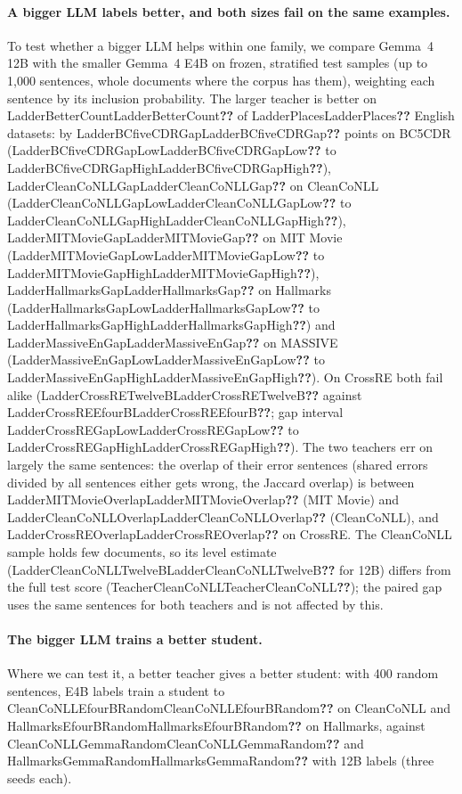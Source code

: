 \documentclass[11pt]{article}
\newcommand{\res}[1]{\ifcsname #1\endcsname\csname #1\endcsname\else\textbf{??}\fi}
\begin{document}
\paragraph{A bigger LLM labels better, and both sizes fail on the same examples.} To test whether a bigger LLM helps within one family, we compare Gemma~4 12B with the smaller Gemma~4 E4B on frozen, stratified test samples (up to 1{,}000 sentences, whole documents where the corpus has them), weighting each sentence by its inclusion probability. The larger teacher is better on \res{LadderBetterCount} of \res{LadderPlaces} English datasets: by \res{LadderBCfiveCDRGap} points on BC5CDR (\res{LadderBCfiveCDRGapLow} to \res{LadderBCfiveCDRGapHigh}), \res{LadderCleanCoNLLGap} on CleanCoNLL (\res{LadderCleanCoNLLGapLow} to \res{LadderCleanCoNLLGapHigh}), \res{LadderMITMovieGap} on MIT Movie (\res{LadderMITMovieGapLow} to \res{LadderMITMovieGapHigh}), \res{LadderHallmarksGap} on Hallmarks (\res{LadderHallmarksGapLow} to \res{LadderHallmarksGapHigh}) and \res{LadderMassiveEnGap} on MASSIVE (\res{LadderMassiveEnGapLow} to \res{LadderMassiveEnGapHigh}). On CrossRE both fail alike (\res{LadderCrossRETwelveB} against \res{LadderCrossREEfourB}; gap interval \res{LadderCrossREGapLow} to \res{LadderCrossREGapHigh}). The two teachers err on largely the same sentences: the overlap of their error sentences (shared errors divided by all sentences either gets wrong, the Jaccard overlap) is between \res{LadderMITMovieOverlap} (MIT Movie) and \res{LadderCleanCoNLLOverlap} (CleanCoNLL), and \res{LadderCrossREOverlap} on CrossRE. The CleanCoNLL sample holds few documents, so its level estimate (\res{LadderCleanCoNLLTwelveB} for 12B) differs from the full test score (\res{TeacherCleanCoNLL}); the paired gap uses the same sentences for both teachers and is not affected by this.

\paragraph{The bigger LLM trains a better student.} Where we can test it, a better teacher gives a better student: with 400 random sentences, E4B labels train a student to \res{CleanCoNLLEfourBRandom} on CleanCoNLL and \res{HallmarksEfourBRandom} on Hallmarks, against \res{CleanCoNLLGemmaRandom} and \res{HallmarksGemmaRandom} with 12B labels (three seeds each).

\begin{table}[t]
\centering
\small
{}
\caption{Two teacher families. Teacher F1 is test micro-F1 (\%) of the labels on the full test split. Error overlap is the Jaccard overlap of the sentences each teacher gets wrong. Student columns are test micro-F1 at the main budget ($N = 400$; CrossRE $N = 200$), mean over the \res{LunaSeeds} seeds that all label sources share. Human is ground truth. Generated by \texttt{active-gliner analyse}.}
\label{tab:second}
\end{table}
\end{document}
